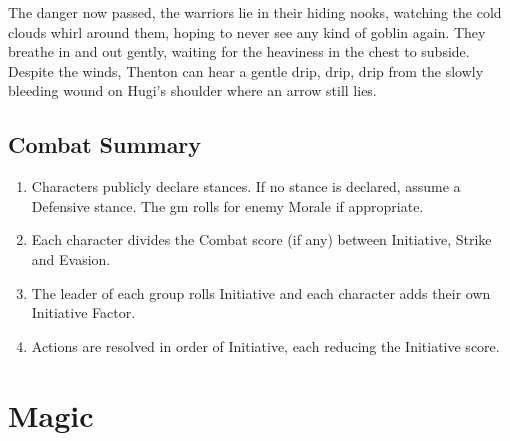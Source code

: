 \documentclass[titlepage,a4paper,openany]{book}
\begin{document}
\begin{multicols}{2}
{\begin{exampletext}
	The danger now passed, the warriors lie in their hiding nooks, watching the cold clouds whirl around them, hoping to never see any kind of goblin again.
	They breathe in and out gently, waiting for the heaviness in the chest to subside. Despite the winds, Thenton can hear a gentle drip, drip, drip from the slowly bleeding wound on Hugi's shoulder where an arrow still lies.
	\end{exampletext}
}{}

\end{multicols}

\section{Combat Summary}

\begin{multicols}{2}

\begin{enumerate}
	\item Characters publicly declare stances. If no stance is declared, assume a Defensive stance. The \gls{gm} rolls for enemy Morale if appropriate.
	\item Each character divides the Combat score (if any) between Initiative, Strike and Evasion.
	\item The leader of each group rolls Initiative and each character adds their own Initiative Factor.
	\item Actions are resolved in order of Initiative, each reducing the Initiative score.
\end{enumerate}


\end{multicols}

\chapter{Magic}
\end{document}
